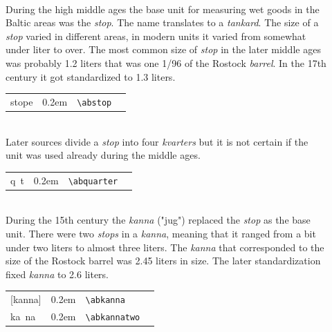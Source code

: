 \documentclass[a4paper]{article}
\newcommand{\samplefont}{\fontsize{16}{16}\abcursivefamily\spaceskip0.2em}
\newcommand{\sample}[1]{{\samplefont #1 \strut}}
\newcommand{\ltxncmd}[1]{\texttt{\textbackslash{}#1}}
\begin{document}
\begin{description}
\item [\sample{\abstop} \emph{stop}, \emph{tuoppi} ]\mbox{} \\
  During the high middle ages the base unit for measuring wet goods in
  the Baltic areas was the \emph{stop}. The name translates to a
  \emph{tankard}. The size of a \emph{stop} varied in different areas,
  in modern units it varied from somewhat under liter to over. The
  most common size of \emph{stop} in the later middle ages was
  probably 1.2 liters that was one 1/96 of the Rostock \emph{barrel}.
  In the 17th century it got standardized to 1.3 liters. 
  \begin{center}
    \begin{tabular}{llll}
      {}stope & \sample{\abstop} & \ltxncmd{abstop} \\
    \end{tabular}
  \end{center}



\item [\sample{\abquarter}, \emph{kvarter}, \emph{kortteli}] \mbox{} \\
  Later sources divide a \emph{stop} into four \emph{kvarters} but it
  is not certain if the unit was used already during the middle ages.
  \begin{center}
    \begin{tabular}{llll}
      {}q~t & \sample{\abquarter} & \ltxncmd{abquarter} \\
    \end{tabular}
  \end{center}


\item [\sample{\abkanna}, \sample{\abkannatwo} \emph{kanna}, \emph{kannu} ]\mbox{} \\
  During the 15th century the \emph{kanna} ("jug") replaced the
  \emph{stop} as the base unit. There were two \emph{stops} in a
  \emph{kanna}, meaning that it ranged from a bit under two liters to
  almost three liters. The \emph{kanna} that corresponded to the size
  of the Rostock barrel was 2.45 liters in size. The later
  standardization fixed \emph{kanna} to 2.6 liters.
  \begin{center}
    \begin{tabular}{llll}
      {}[kanna] & \sample{\abkanna} & \ltxncmd{abkanna} \\
      {}ka~na & \sample{\abkannatwo} & \ltxncmd{abkannatwo} \\
    \end{tabular}
  \end{center}


\end{description}
\end{document}
